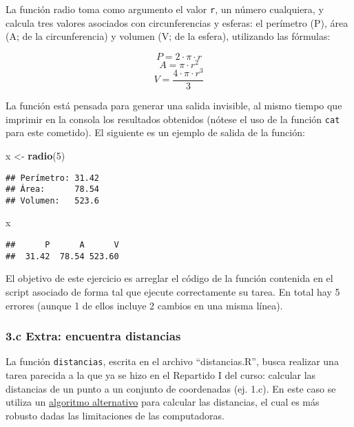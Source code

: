 \documentclass[]{article}
\newenvironment{Shaded}{}{}
\newcommand{\KeywordTok}[1]{\textcolor[rgb]{0.00,0.44,0.13}{\textbf{{#1}}}}
\newcommand{\DecValTok}[1]{\textcolor[rgb]{0.25,0.63,0.44}{{#1}}}
\newcommand{\StringTok}[1]{\textcolor[rgb]{0.25,0.44,0.63}{{#1}}}
\newcommand{\NormalTok}[1]{{#1}}
\begin{document}
La función radio toma como argumento el valor \texttt{r}, un número
cualquiera, y calcula tres valores asociados con circunferencias y
esferas: el perímetro (P), área (A; de la circunferencia) y volumen (V;
de la esfera), utilizando las fórmulas:

\[
  P = 2 \cdot \pi \cdot r
\] \[
  A = \pi \cdot r^2
\] \[
  V = \frac{4 \cdot \pi \cdot r^3}{3}
\]

La función está pensada para generar una salida invisible, al mismo
tiempo que imprimir en la consola los resultados obtenidos (nótese el
uso de la función \texttt{cat} para este cometido). El siguiente es un
ejemplo de salida de la función:

\begin{Shaded}
\begin{Highlighting}[]
\NormalTok{x <-}\StringTok{ }\KeywordTok{radio}\NormalTok{(}\DecValTok{5}\NormalTok{)}
\end{Highlighting}
\end{Shaded}

\begin{verbatim}
## Perímetro: 31.42 
## Área:      78.54 
## Volumen:   523.6
\end{verbatim}

\begin{Shaded}
\begin{Highlighting}[]
\NormalTok{x}
\end{Highlighting}
\end{Shaded}

\begin{verbatim}
##      P      A      V 
##  31.42  78.54 523.60
\end{verbatim}

El objetivo de este ejercicio es arreglar el código de la función
contenida en el script asociado de forma tal que ejecute correctamente
su tarea. En total hay 5 errores (aunque 1 de ellos incluye 2 cambios en
una misma línea).

\subsubsection{3.c Extra: encuentra distancias}

La función \texttt{distancias}, escrita en el archivo ``distancias.R'',
busca realizar una tarea parecida a la que ya se hizo en el Repartido I
del curso: calcular las distancias de un punto a un conjunto de
coordenadas (ej. 1.c). En este caso se utiliza un
\href{http://www.johndcook.com/blog/2010/06/02/whats-so-hard-about-finding-a-hypotenuse/}{algoritmo
alternativo} para calcular las distancias, el cual es más robusto dadas
las limitaciones de las computadoras.
\end{document}
